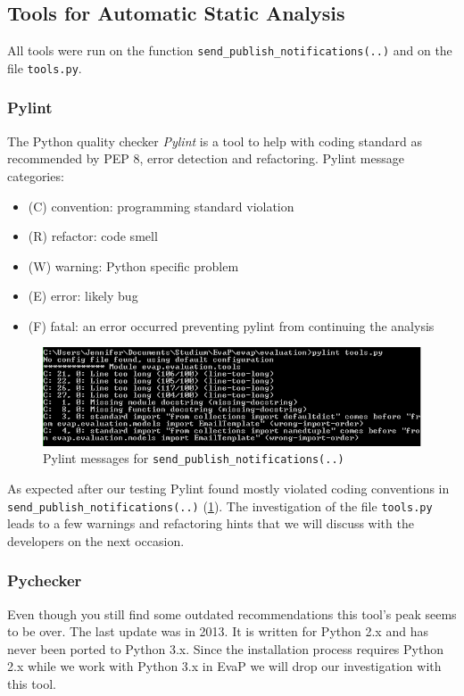 \subsection{Tools for Automatic Static Analysis}
All tools were run on the function \texttt{send\_publish\_notifications(..)} and on the file \texttt{tools.py}.

\subsubsection{Pylint}
The Python quality checker \emph{Pylint} is a tool to help with coding standard as recommended by PEP 8, error detection and refactoring.
Pylint message categories:
\begin{itemize}
    \item (C) convention: programming standard violation
    \item (R) refactor: code smell
    \item (W) warning: Python specific problem
    \item (E) error: likely bug
    \item (F) fatal: an error occurred preventing pylint from continuing the analysis
\end{itemize}
\begin{figure}[h]
    \centering
    \includegraphics[width=\textwidth, keepaspectratio]{graphics/pylint_send_publish_notifications_1}
    \caption{Pylint messages for \texttt{send\_publish\_notifications(..)}}
    \label{fig:pylint}
\end{figure} 
As expected after our testing Pylint found mostly violated coding conventions in \texttt{send\_publish\_notifications(..)} (\ref{fig:pylint}).
The investigation of the file \texttt{tools.py} leads to a few warnings and refactoring hints that we will discuss with the developers on the next occasion.

\subsubsection{Pychecker}
Even though you still find some outdated recommendations this tool's peak seems to be over. 
The last update was in 2013.
It is written for Python 2.x and has never been ported to Python 3.x.
Since the installation process requires Python 2.x while we work with Python 3.x in EvaP we will drop our investigation with this tool.

